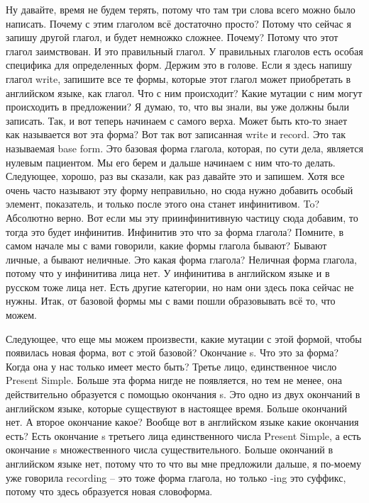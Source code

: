 \documentclass[main.tex]{subfiles}
\begin{document}
Ну давайте, время не будем терять, потому что там три слова всего можно было написать.
Почему с этим глаголом всё достаточно просто?
Потому что сейчас я запишу другой глагол, и будет немножко сложнее.
Почему?
Потому что этот глагол заимствован.
И это правильный глагол.
У правильных глаголов есть особая специфика для определенных форм.
Держим это в голове.
Если я здесь напишу глагол write, запишите все те формы, которые этот глагол может приобретать в английском языке, как глагол.
Что с ним происходит?
Какие мутации с ним могут происходить в предложении?
Я думаю, то, что вы знали, вы уже должны были записать.
Так, и вот теперь начинаем с самого верха.
Может быть кто-то знает как называется вот эта форма?
Вот так вот записанная write и record.
Это так называемая base form.
Это базовая форма глагола, которая, по сути дела, является нулевым пациентом.
Мы его берем и дальше начинаем с ним что-то делать.
Следующее, хорошо, раз вы сказали, как раз давайте это и запишем.
Хотя все очень часто называют эту форму неправильно, но сюда нужно добавить особый элемент, показатель, и только после этого она станет инфинитивом.
To?
Абсолютно верно.
Вот если мы эту приинфинитивную частицу сюда добавим, то тогда это будет инфинитив.
Инфинитив это что за форма глагола?
Помните, в самом начале мы с вами говорили, какие формы глагола бывают?
Бывают личные, а бывают неличные.
Это какая форма глагола?
Неличная форма глагола, потому что у инфинитива лица нет.
У инфинитива в английском языке и в русском тоже лица нет.
Есть другие категории, но нам они здесь пока сейчас не нужны.
Итак, от базовой формы мы с вами пошли образовывать всё то, что можем.

Следующее, что еще мы можем произвести, какие мутации с этой формой, чтобы появилась новая форма, вот с этой базовой?
Окончание s.
Что это за форма?
Когда она у нас только имеет место быть?
Третье лицо, единственное число Present Simple.
Больше эта форма нигде не появляется, но тем не менее, она действительно образуется с помощью окончания s.
Это одно из двух окончаний в английском языке, которые существуют в настоящее время.
Больше окончаний нет.
А второе окончание какое?
Вообще вот в английском языке какие окончания есть?
Есть окончание s третьего лица единственного числа Present Simple, а есть окончание s множественного числа существительного.
Больше окончаний в английском языке нет, потому что то что вы мне предложили дальше, я по-моему уже говорила recording -- это тоже форма глагола, но только -ing это суффикс, потому что здесь образуется новая словоформа.
\end{document}
